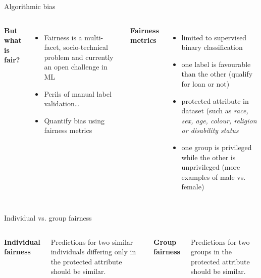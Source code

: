 \documentclass[aspectratio=169]{beamer}
\begin{document}
\begin{frame}{Algorithmic bias}
  \begin{columns}[t, onlytextwidth]
    \begin{center}
      \textbf{But what is fair?}
    \end{center}
    \begin{itemize}
      \item Fairness is a multi-facet, socio-technical problem and
        currently an open challenge in ML
      \item Perils of manual label validation\ldots
      \item Quantify bias using fairness metrics
    \end{itemize}

    \begin{center}
      \textbf{Fairness metrics}
    \end{center}
    \begin{itemize}
        \item limited to supervised binary classification
        \item one label is favourable than the other (qualify for loan
          or not)
        \item protected attribute in dataset (such as \emph{race, sex, age,
          colour, religion or disability status}
        \item one group is privileged while the other is unprivileged
          (more examples of male vs. female)
    \end{itemize}
  \end{columns}
\end{frame}

\begin{frame}{Individual vs. group fairness}
  \begin{columns}[t, onlytextwidth]
    \begin{center}
      \textbf{Individual fairness}
    \end{center}

    Predictions for two similar individuals differing only in the
    protected attribute should be similar.
    \begin{center}
      \textbf{Group fairness}
    \end{center}

    Predictions for two groups in the protected attribute should be
    similar.
  \end{columns}
\end{frame}
\end{document}
